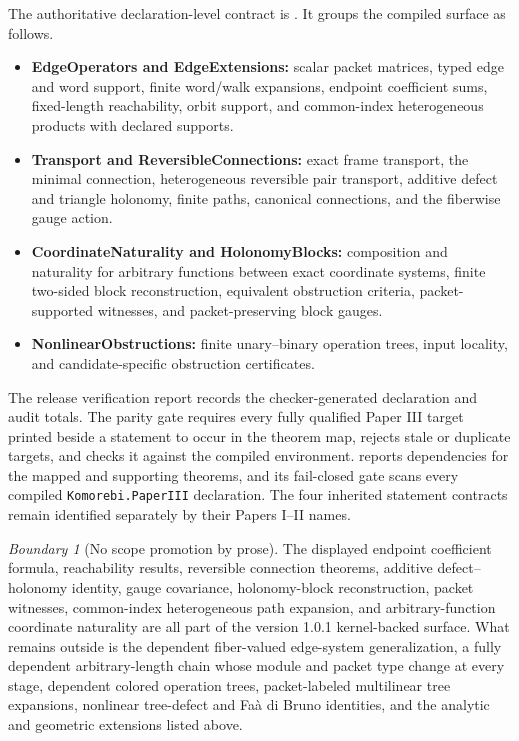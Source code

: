 \documentclass[11pt]{article}
\theoremstyle{definition}
\theoremstyle{remark}
\newtheorem{boundary}[theorem]{Boundary}
\newcommand{\leanname}[1]{\nolinkurl{#1}}
\begin{document}
The authoritative declaration-level contract is
.  It groups the compiled
surface as follows.
\begin{itemize}
\item \textbf{EdgeOperators and EdgeExtensions:} scalar packet matrices,
typed edge and word support, finite word/walk expansions, endpoint coefficient
sums, fixed-length reachability, orbit support, and common-index
heterogeneous products with declared supports.
\item \textbf{Transport and ReversibleConnections:} exact frame transport,
the minimal connection, heterogeneous reversible pair transport, additive
defect and triangle holonomy, finite paths, canonical connections, and the
fiberwise gauge action.
\item \textbf{CoordinateNaturality and HolonomyBlocks:} composition and
naturality for arbitrary functions between exact coordinate systems, finite
two-sided block reconstruction, equivalent obstruction criteria,
packet-supported witnesses, and packet-preserving block gauges.
\item \textbf{NonlinearObstructions:} finite unary--binary operation trees,
input locality, and candidate-specific obstruction certificates.
\end{itemize}
The release verification report records the checker-generated declaration
and audit totals.  The parity gate requires every fully qualified Paper III
target printed beside a statement to occur in the theorem map, rejects stale
or duplicate targets, and checks it against the compiled environment.
 reports dependencies for the mapped and supporting
theorems, and its fail-closed gate scans every compiled
\leanname{Komorebi.PaperIII} declaration.  The four inherited statement
contracts remain identified separately by their Papers I--II names.

\begin{boundary}[No scope promotion by prose]
The displayed endpoint coefficient formula, reachability results, reversible
connection theorems, additive defect--holonomy identity, gauge covariance,
holonomy-block reconstruction, packet witnesses, common-index heterogeneous
path expansion, and arbitrary-function coordinate naturality are all part of
the version 1.0.1 kernel-backed surface.  What remains outside is the
dependent fiber-valued edge-system generalization, a fully dependent
arbitrary-length chain whose module and packet type change at every stage,
dependent colored operation trees, packet-labeled multilinear tree
expansions, nonlinear tree-defect and Fa\`a di Bruno identities, and the
analytic and geometric extensions listed above.
\end{boundary}
\end{document}
